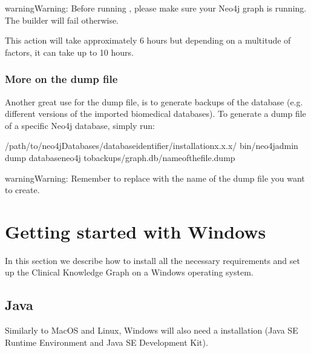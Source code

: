 \documentclass[letterpaper,10pt,english]{sphinxmanual}
\begin{document}
\begin{sphinxadmonition}{warning}{Warning:}
Before running , please make sure your Neo4j graph is running. The builder will fail otherwise.
\end{sphinxadmonition}

This action will take approximately 6 hours but depending on a multitude of factors, it can take up to 10 hours.


\subsubsection{More on the dump file}
\label{\detokenize{intro/getting-started-with-build:more-on-the-dump-file}}
Another great use for the dump file, is to generate backups of the database (e.g. different versions of the imported biomedical databases).
To generate a dump file of a specific Neo4j database, simply run:

\begin{sphinxVerbatim}[commandchars=\\\{\}]
\PYGZdl{}  /path/to/neo4jDatabases/database\PYGZhy{}identifier/installation\PYGZhy{}x.x.x/
\PYGZdl{} bin/neo4j\PYGZhy{}admin dump \PYGZhy{}\PYGZhy{}databaseneo4j \PYGZhy{}\PYGZhy{}tobackups/graph.db/name\PYGZus{}of\PYGZus{}the\PYGZus{}file.dump
\end{sphinxVerbatim}

\begin{sphinxadmonition}{warning}{Warning:}
Remember to replace  with the name of the dump file you want to create.
\end{sphinxadmonition}


\section{Getting started with Windows}
\label{\detokenize{intro/getting-started-with-windows:getting-started-with-windows}}\label{\detokenize{intro/getting-started-with-windows:windows-installation}}\label{\detokenize{intro/getting-started-with-windows::doc}}
In this section we describe how to install all the necessary requirements and set up the Clinical Knowledge Graph on a Windows operating system.


\subsection{Java}
\label{\detokenize{intro/getting-started-with-windows:java}}
Similarly to MacOS and Linux, Windows will also need a  installation (Java SE Runtime Environment and Java SE Development Kit).
\end{document}
